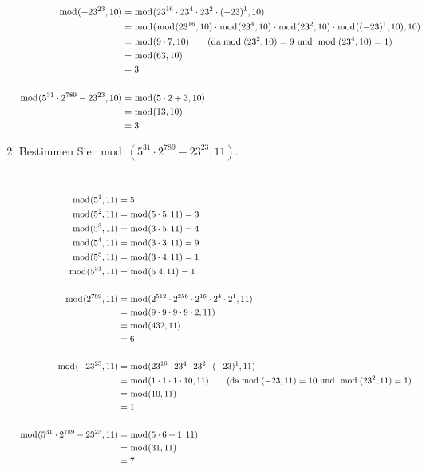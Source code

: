 \begin{enumerate}[label=(\alph*)]
\begin{align*}
			\bmod(-23^{23},10) &= \bmod(23^{16}\cdot23^{4}\cdot23^{2}\cdot(-23)^1,10) 
			\\&= \bmod(\bmod(23^{16},10)\cdot\bmod(23^{4},10)\cdot\bmod(23^{2},10)\cdot\bmod((-23)^1,10),10)
			\\&= \bmod(9\cdot 7, 10) \textrm{\qquad (da} \bmod(23^2,10)=9 \textrm{ und }\bmod(23^4,10)=1)
			\\&= \bmod(63,10) 
			\\&= 3 \\\\
			\bmod(5^{31} \cdot 2^{789}-23^{23}, 10) &= \bmod(5 \cdot 2 + 3,10)	
			\\&= \bmod(13,10) 
			\\&= 3
		\end{align*}

		\item  Bestimmen Sie $ \bmod(5^{31} \cdot 2^{789}-23^{23}, 11) $. \\
		\begin{align*}
			\\
			\\ \bmod(5^{1},11) &= 5
			\\ \bmod(5^{2},11) &= \bmod(5 \cdot 5, 11) = 3
			\\ \bmod(5^{3},11) &= \bmod(3 \cdot 5, 11) = 4
			\\ \bmod(5^{4},11) &= \bmod(3 \cdot 3, 11) = 9
			\\ \bmod(5^{5},11) &= \bmod(3 \cdot 4, 11) = 1
			\\ \bmod(5^{31},11) &= \bmod(5^ \cdot 4, 11) = 1
			 \\\\
			\bmod(2^{789},11) &= \bmod(2^{512}\cdot2^{256}\cdot2^{16}\cdot2^4\cdot2^1,11)
			\\&= \bmod(9\cdot 9\cdot 9\cdot 9\cdot 2, 11)
			\\&= \bmod(432,11)
			\\&= 6 \\\\
			\bmod(-23^{23},11) &= \bmod(23^{16}\cdot23^{4}\cdot23^{2}\cdot(-23)^1,11)
			\\&= \bmod(1\cdot 1\cdot 1\cdot 10, 11) \textrm{\qquad (da} \bmod(-23,11)=10 \textrm{ und }\bmod(23^2,11)=1)
			\\&= \bmod(10,11)
			\\&= 1 \\\\ 
			\bmod(5^{31} \cdot 2^{789}-23^{23}, 11) &= \bmod(5 \cdot 6 +1,11)
			\\&= \bmod(31,11)
			\\&= 7 
		\end{align*}


\end{enumerate}
